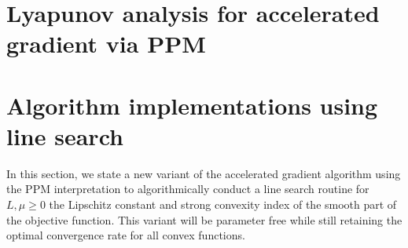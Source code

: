 \documentclass[12pt]{article}
\begin{document}


\section{Lyapunov analysis for accelerated gradient via PPM}\label{sec:generic_ag_ppm_lyapunov_analysis}

   

\section{Algorithm implementations using line search}\label{sec:algorithm_improved}
    In this section, we state a new variant of the accelerated gradient algorithm using the PPM interpretation to algorithmically conduct a line search routine for $L, \mu \ge 0$ the Lipschitz constant and strong convexity index of the smooth part of the objective function. 
    This variant will be parameter free while still retaining the optimal convergence rate for all convex functions. 
    
\end{document}
